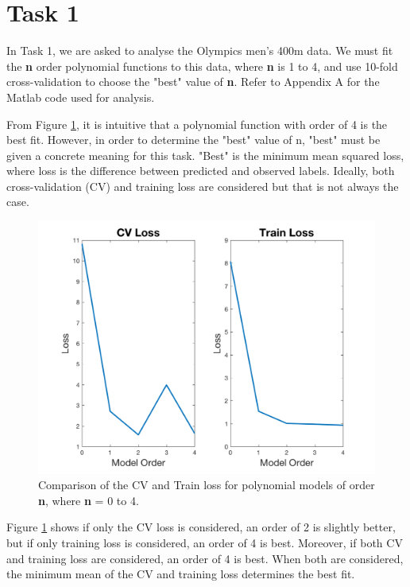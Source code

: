 \section{Task 1}{\label{s1}
In Task 1, we are asked to analyse the Olympics men's 400m data. We must fit the \textbf{n} order polynomial functions to this data, where \textbf{n} is 1 to 4, and use 10-fold cross-validation to choose the "best" value of \textbf{n}. Refer to Appendix A for the Matlab code used for analysis.

From Figure \ref{fig:CVT4}, it is intuitive that a polynomial function with order of 4 is the best fit. However, in order to determine the "best" value of n, "best" must be given a concrete meaning for this task. "Best" is the minimum mean squared loss, where loss is the difference between predicted and observed labels. Ideally, both cross-validation (CV) and training loss are considered but that is not always the case.

\begin{figure}[h]
	\centering
	\includegraphics[width=0.8\linewidth]{images/CVLossANDTrainLoss4}
	\caption{Comparison of the CV and Train loss for polynomial models of order \textbf{n}, where \textbf{n} = 0 to 4.}
	\label{fig:CVT4}
\end{figure}

Figure \ref{fig:CVT4} shows if only the CV loss is considered, an order of 2 is slightly better, but if only training loss is considered, an order of 4 is best. Moreover, if both CV and training loss are considered, an order of 4 is best. When both are considered, the minimum mean of the CV and training loss determines the best fit.

}
